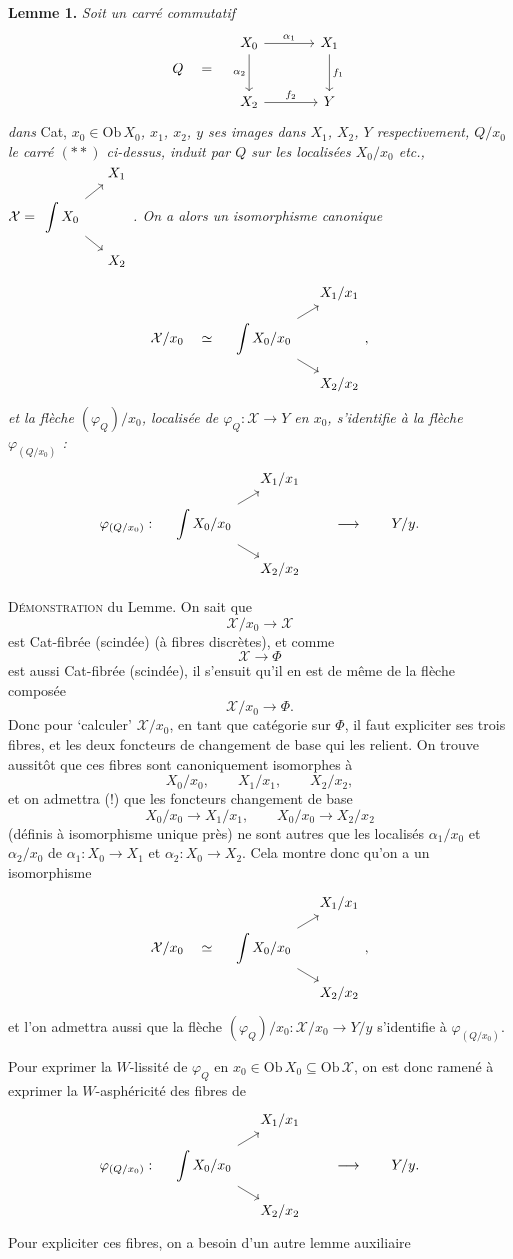 \documentclass[11pt]{article}
\newcommand{\printedpage}[1]{\marginpar{\footnotesize p.~#1}}
\newcommand{\msp}[1]{\marginpar{\footnotesize [#1]}}
\newcommand{\intdiag}[3]{\begin{tikzcd}[row sep=small,column sep=small,ampersand replacement=\&,baseline=(\tikzcdmatrixname-2-1.base)]
 \& #2 \\
 \displaystyle\int #1 \arrow[ur] \arrow[dr] \& \\
 \& #3
\end{tikzcd}}
\begin{document}
\noindent\textbf{Lemme 1.} \textit{Soit un carré commutatif}
\[
Q \quad = \quad
\begin{tikzcd}[row sep=large,column sep=large]
X_0 \arrow[r, "\alpha_1"] \arrow[d, "\alpha_2"'] & X_1 \arrow[d, "f_1"] \\
X_2 \arrow[r, "f_2"] & Y
\end{tikzcd}
\]
\textit{dans} Cat, \textit{$x_0\in\mathrm{Ob}\,X_0$, $x_1$, $x_2$, $y$ ses images dans $X_1$, $X_2$, $Y$ respectivement, $Q/x_0$ le carré $(**)$ ci-dessus, induit par $Q$ sur les localisées $X_0/x_0$ etc., $\mathcal{X} = \intdiag{X_0}{X_1}{X_2}$. On a alors un}
\printedpage{105}
\msp{page 153}
\textit{isomorphisme canonique}
\[
\mathcal{X}/x_0 \quad\simeq\quad \intdiag{X_0/x_0}{X_1/x_1}{X_2/x_2} ,
\]
\textit{et la flèche $(\varphi_Q)/x_0$, localisée de $\varphi_Q : \mathcal{X}\longrightarrow Y$ en $x_0$, s'identifie à la flèche $\varphi_{(Q/x_0)}$ :}
\[
\varphi_{(Q/x_0)} : \quad \intdiag{X_0/x_0}{X_1/x_1}{X_2/x_2} \qquad\longrightarrow\qquad Y/y.
\]

\noindent\textsc{Démonstration} du Lemme. On sait que
\[
\mathcal{X}/x_0\longrightarrow\mathcal{X}
\]
est Cat-fibrée (scindée) (à fibres discrètes), et comme
\[
\mathcal{X}\longrightarrow\Phi
\]
est aussi Cat-fibrée (scindée), il s'ensuit qu'il en est de même de la flèche composée
\[
\mathcal{X}/x_0\longrightarrow\Phi.
\]
Donc pour `calculer' $\mathcal{X}/x_0$, en tant que catégorie sur $\Phi$, il faut expliciter ses trois fibres, et les deux foncteurs de changement de base qui les relient. On trouve aussitôt que ces fibres sont canoniquement isomorphes à
\[
X_0/x_0, \qquad X_1/x_1, \qquad X_2/x_2,
\]
et on admettra (!) que les foncteurs changement de base
\msp{page 154}
\[
X_0/x_0\longrightarrow X_1/x_1, \qquad X_0/x_0\longrightarrow X_2/x_2
\]
(définis à isomorphisme unique près) ne sont autres que les localisés $\alpha_1/x_0$ et $\alpha_2/x_0$ de $\alpha_1 : X_0\longrightarrow X_1$ et $\alpha_2 : X_0\longrightarrow X_2$. Cela montre donc qu'on a un isomorphisme
\[
\mathcal{X}/x_0 \quad\simeq\quad \intdiag{X_0/x_0}{X_1/x_1}{X_2/x_2} ,
\]
\printedpage{106}
et l'on admettra aussi que la flèche $(\varphi_Q)/x_0 : \mathcal{X}/x_0\longrightarrow Y/y$ s'identifie à $\varphi_{(Q/x_0)}$.

Pour exprimer la $W$-lissité de $\varphi_Q$ en $x_0\in\mathrm{Ob}\,X_0\subseteq\mathrm{Ob}\,\mathcal{X}$, on est donc ramené à exprimer la $W$-asphéricité des fibres de
\[
\varphi_{(Q/x_0)} : \quad \intdiag{X_0/x_0}{X_1/x_1}{X_2/x_2} \qquad\longrightarrow\qquad Y/y.
\]
Pour expliciter ces fibres, on a besoin d'un autre lemme auxiliaire
\end{document}
